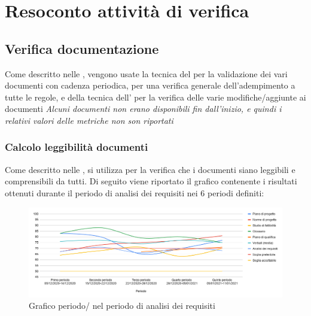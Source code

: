 
\section{Resoconto attività di verifica}

\subsection{Verifica documentazione}
 Come descritto nelle , vengono usate la tecnica del   per la validazione dei vari documenti con cadenza periodica, per una verifica generale dell'adempimento a tutte le regole, e della tecnica dell'  per la verifica delle varie modifiche/aggiunte ai documenti
\newline
\newline
\emph{Alcuni documenti non erano disponibili fin dall'inizio, e quindi i relativi valori delle metriche non son riportati}


\subsubsection{Calcolo leggibilità documenti}
Come descritto nelle , si utilizza  per la verifica che i documenti siano leggibili e comprensibili da tutti. 
Di seguito viene riportato il grafico contenente i risultati ottenuti durante il periodo di analisi dei requisiti nei 6 periodi definiti:

\begin{figure}[H]
	\centering
	\includegraphics[width=0.8\linewidth]{./res/images/gulpease.png}
	\caption{Grafico periodo/ nel periodo di analisi dei requisiti}
	\label{fig:Grafico indice di Gulpease periodo di analisi dei requisiti}
\end{figure}

